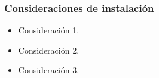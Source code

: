\subsubsection{Consideraciones de instalación}
\begin{itemize}
    \item Consideración 1.
    \item Consideración 2.
    \item Consideración 3.
\end{itemize}